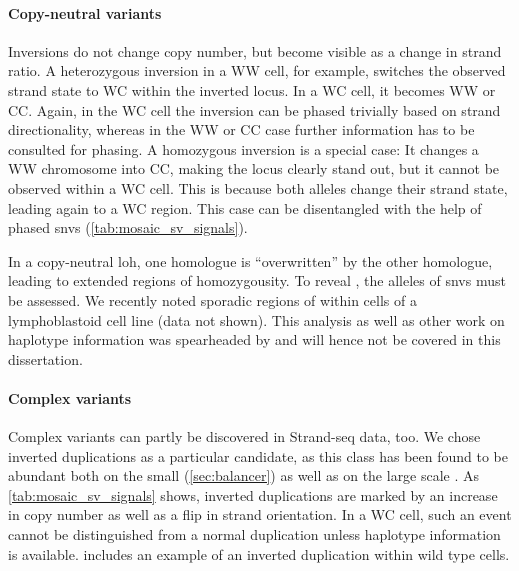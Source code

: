 \paragraph{Copy-neutral variants}
Inversions do not change copy number, but become visible as a change in strand
ratio. A heterozygous inversion in a WW cell, for example, switches the observed strand
state to WC within the inverted locus. In a WC cell, it becomes WW or CC. Again,
in the WC cell the inversion can be phased trivially based on strand
directionality, whereas in the WW or CC case further \snv information has to be
consulted for phasing. A homozygous inversion is a special case: It changes a WW
chromosome into CC, making the locus clearly stand out, but it cannot be
observed within a WC cell. This is because both alleles change their strand
state, leading again to a WC region. This case can be disentangled with the help
of phased \acp{snv} (\cref{tab:mosaic_sv_signals}).

In a copy-neutral \acl{loh}, one homologue is
``overwritten'' by the other homologue, leading to extended regions of
homozygousity. To reveal \loh, the alleles of \acp{snv} must be assessed. We recently
noted sporadic regions of \loh within cells of a lymphoblastoid cell
line (data not shown). This analysis as well as other work on haplotype information
was spearheaded by \david and will hence not be covered in this
dissertation.

\paragraph{Complex variants}
Complex variants can partly be discovered in Strand-seq data, too. We chose
inverted duplications as a particular candidate, as this class has been found to
be abundant both on the small (\cref{sec:balancer}) as well as on the large
scale \citep{Chaisson2017}. As \cref{tab:mosaic_sv_signals} shows, inverted
duplications are marked by an increase in copy number as well as a flip in
strand orientation. In a WC cell, such an event cannot be distinguished from a
normal duplication unless haplotype information is available. 
includes an example of an inverted duplication within  wild type cells.

